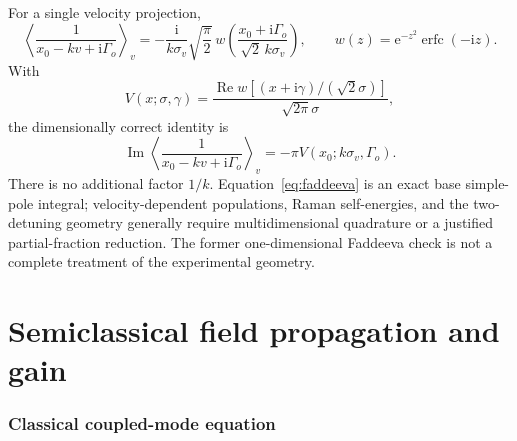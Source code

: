 \documentclass[11pt,a4paper]{article}
\newcommand{\ii}{\mathrm i}
\newcommand{\e}{\mathrm e}
\newcommand{\Rea}{\operatorname{Re}}
\newcommand{\Ima}{\operatorname{Im}}
\begin{document}
For a single velocity projection,
\begin{equation}
\left\langle\frac1{x_0-kv+\ii\Gamma_o}\right\rangle_v
=-\frac{\ii}{k\sigma_v}\sqrt{\frac{\pi}{2}}\,
w\!\left(\frac{x_0+\ii\Gamma_o}{\sqrt2\,k\sigma_v}\right),
\qquad
w(z)=\e^{-z^2}\operatorname{erfc}(-\ii z).
\label{eq:faddeeva}
\end{equation}
With
\[
V(x;\sigma,\gamma)=
\frac{\Rea w[(x+\ii\gamma)/(\sqrt2\sigma)]}
{\sqrt{2\pi}\sigma},
\]
the dimensionally correct identity is
\begin{equation}
\boxed{\;
\Ima\left\langle\frac1{x_0-kv+\ii\Gamma_o}\right\rangle_v
=-\pi V(x_0;k\sigma_v,\Gamma_o).\;}
\label{eq:voigt-correct}
\end{equation}
There is no additional factor $1/k$. Equation~\eqref{eq:faddeeva} is an exact
base simple-pole integral; velocity-dependent populations, Raman
self-energies, and the two-detuning geometry generally require multidimensional
quadrature or a justified partial-fraction reduction. The former
one-dimensional Faddeeva check is not a complete treatment of the experimental
geometry.

\part{Semiclassical field propagation and gain}

\section{Classical coupled-mode equation}
\end{document}
